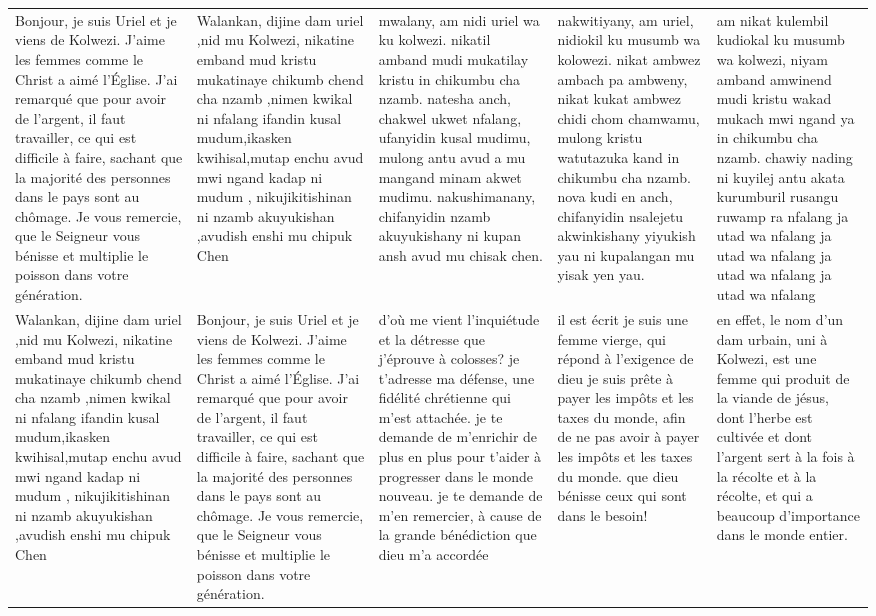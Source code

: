 \begin{landscape}
\begin{longtable}{p{4.5cm}p{4.5cm}p{4.5cm}p{4.5cm}p{4.5cm}}
\bottomrule
\endlastfoot
Bonjour, je suis Uriel et je viens de Kolwezi. J'aime les femmes comme le Christ a aimé l'Église. J'ai remarqué que pour avoir de l'argent, il faut travailler, ce qui est difficile à faire, sachant que la majorité des personnes dans le pays sont au chômage. Je vous remercie, que le Seigneur vous bénisse et multiplie le poisson dans votre génération. & Walankan, dijine dam uriel ,nid mu Kolwezi, nikatine emband mud kristu mukatinaye chikumb chend cha nzamb ,nimen kwikal ni nfalang ifandin kusal mudum,ikasken kwihisal,mutap enchu avud mwi ngand kadap ni mudum , nikujikitishinan  ni nzamb akuyukishan ,avudish enshi mu chipuk Chen & mwalany, am nidi uriel wa ku kolwezi. nikatil amband mudi mukatilay kristu in chikumbu cha nzamb. natesha anch, chakwel ukwet nfalang, ufanyidin kusal mudimu, mulong antu avud a mu mangand minam akwet mudimu. nakushimanany, chifanyidin nzamb akuyukishany ni kupan ansh avud mu chisak chen. & nakwitiyany, am uriel, nidiokil ku musumb wa kolowezi. nikat ambwez ambach pa ambweny, nikat kukat ambwez chidi chom chamwamu, mulong kristu watutazuka kand in chikumbu cha nzamb. nova kudi en anch, chifanyidin nsalejetu akwinkishany yiyukish yau ni kupalangan mu yisak yen yau. & am nikat kulembil kudiokal ku musumb wa kolwezi, niyam amband amwinend mudi kristu wakad mukach mwi ngand ya in chikumbu cha nzamb. chawiy nading ni kuyilej antu akata kurumburil rusangu ruwamp ra nfalang ja utad wa nfalang ja utad wa nfalang ja utad wa nfalang ja utad wa nfalang \\
Walankan, dijine dam uriel ,nid mu Kolwezi, nikatine emband mud kristu mukatinaye chikumb chend cha nzamb ,nimen kwikal ni nfalang ifandin kusal mudum,ikasken kwihisal,mutap enchu avud mwi ngand kadap ni mudum , nikujikitishinan  ni nzamb akuyukishan ,avudish enshi mu chipuk Chen & Bonjour, je suis Uriel et je viens de Kolwezi. J'aime les femmes comme le Christ a aimé l'Église. J'ai remarqué que pour avoir de l'argent, il faut travailler, ce qui est difficile à faire, sachant que la majorité des personnes dans le pays sont au chômage. Je vous remercie, que le Seigneur vous bénisse et multiplie le poisson dans votre génération. & d'où me vient l'inquiétude et la détresse que j'éprouve à colosses? je t'adresse ma défense, une fidélité chrétienne qui m'est attachée. je te demande de m'enrichir de plus en plus pour t'aider à progresser dans le monde nouveau. je te demande de m'en remercier, à cause de la grande bénédiction que dieu m'a accordée & il est écrit je suis une femme vierge, qui répond à l'exigence de dieu je suis prête à payer les impôts et les taxes du monde, afin de ne pas avoir à payer les impôts et les taxes du monde. que dieu bénisse ceux qui sont dans le besoin! & en effet, le nom d'un dam urbain, uni à Kolwezi, est une femme qui produit de la viande de jésus, dont l'herbe est cultivée et dont l'argent sert à la fois à la récolte et à la récolte, et qui a beaucoup d'importance dans le monde entier. \\

\end{longtable}
\end{landscape}
